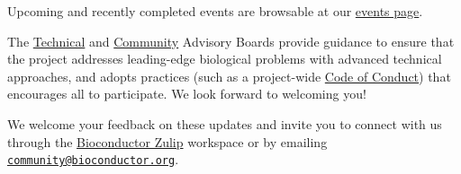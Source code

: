 Upcoming and recently completed events are browsable at our
\href{https://bioconductor.org/help/events/}{events page}.

The \href{https://bioconductor.org/about/technical-advisory-board/}{Technical} and \href{https://bioconductor.org/about/community-advisory-board/}{Community}
Advisory Boards provide guidance to ensure that the project addresses
leading-edge biological problems with advanced technical approaches,
and adopts practices (such as a
project-wide \href{https://bioconductor.org/about/code-of-conduct/}{Code of Conduct})
that encourages all to participate. We look forward to
welcoming you!

We welcome your feedback on these updates and invite you to connect with us through the \href{https://chat.bioconductor.org}{Bioconductor Zulip} workspace or by emailing \href{mailto:community@bioconductor.org}{\nolinkurl{community@bioconductor.org}}.


\address{%
Maria Doyle\\
University of Limerick\\%
\\
%
%
%
%
}

\address{%
Bioconductor Core Developer Team\\
Dana-Farber Cancer Institute, Roswell Park Comprehensive Cancer Center, City University of New York, Fred Hutchinson Cancer Research Center, Mass General Brigham\\%
\\
%
%
%
%
}
